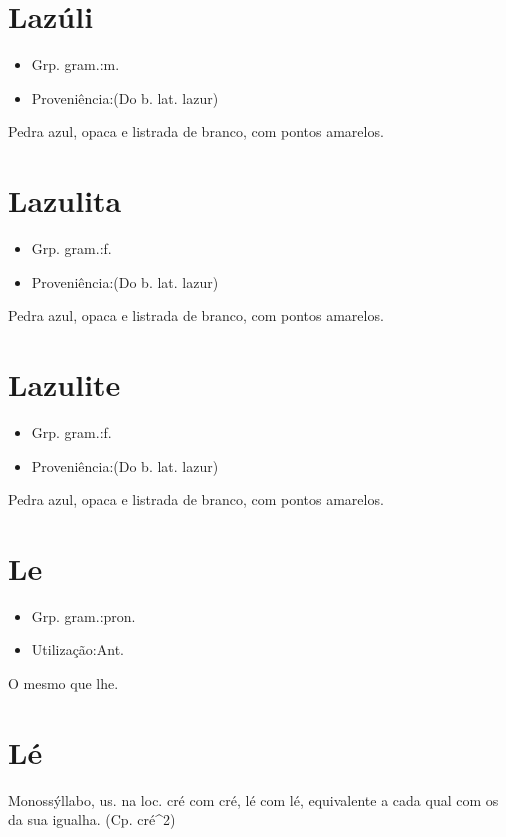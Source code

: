 \section{Lazúli}
\begin{itemize}
\item {Grp. gram.:m.}
\end{itemize}
\begin{itemize}
\item {Proveniência:(Do b. lat. \textunderscore lazur\textunderscore )}
\end{itemize}
Pedra azul, opaca e listrada de branco, com pontos amarelos.
\section{Lazulita}
\begin{itemize}
\item {Grp. gram.:f.}
\end{itemize}
\begin{itemize}
\item {Proveniência:(Do b. lat. \textunderscore lazur\textunderscore )}
\end{itemize}
Pedra azul, opaca e listrada de branco, com pontos amarelos.
\section{Lazulite}
\begin{itemize}
\item {Grp. gram.:f.}
\end{itemize}
\begin{itemize}
\item {Proveniência:(Do b. lat. \textunderscore lazur\textunderscore )}
\end{itemize}
Pedra azul, opaca e listrada de branco, com pontos amarelos.
\section{Le}
\begin{itemize}
\item {Grp. gram.:pron.}
\end{itemize}
\begin{itemize}
\item {Utilização:Ant.}
\end{itemize}
O mesmo que \textunderscore lhe\textunderscore .
\section{Lé}
Monossýllabo, us. na loc. \textunderscore cré com cré, lé com lé\textunderscore , equivalente a \textunderscore cada qual com os da sua igualha\textunderscore .
(Cp. \textunderscore cré\textunderscore ^2)
